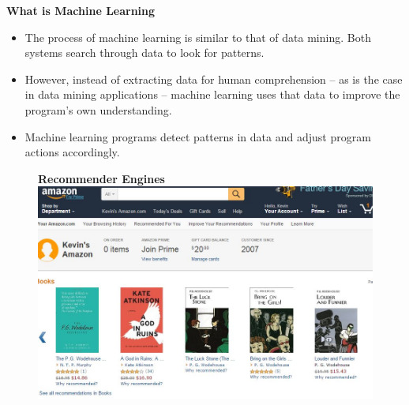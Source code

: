 \documentclass[MASTER.tex]{subfiles}
\begin{document}
\begin{frame}
\Large
\textbf{What is Machine Learning}
\begin{itemize}
	\item The process of machine learning is similar to that of data mining. Both systems search through data to look for patterns. 
	\item However, instead of extracting data for human comprehension -- as is the case in data mining applications -- machine learning uses that data to improve the program's own understanding. \item Machine learning programs detect patterns in data and adjust program actions accordingly. 
\end{itemize}
\end{frame}
%
\begin{frame}
	\begin{figure}
\textbf{	Recommender Engines}
\centering
\includegraphics[width=1.1\linewidth]{amazonrecommends}

\end{figure}

	
\end{frame}	
\end{document}
